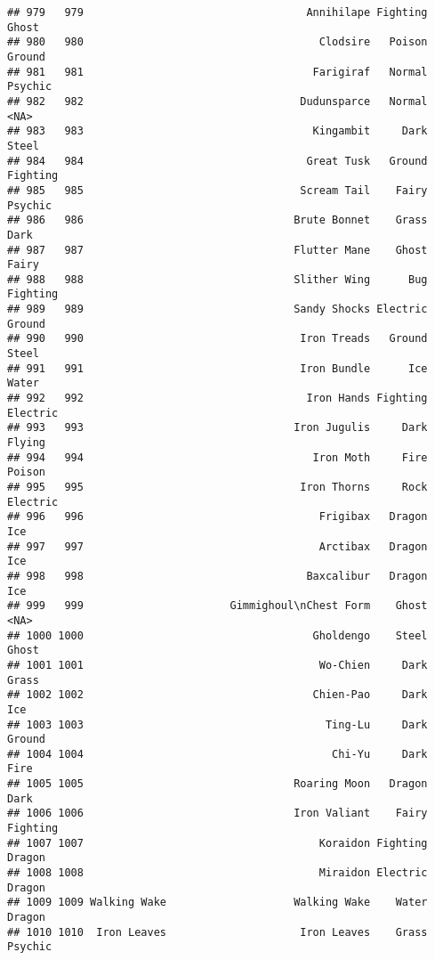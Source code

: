 \documentclass[
]{article}
\begin{document}
\begin{verbatim}
## 979   979                                   Annihilape Fighting    Ghost
## 980   980                                     Clodsire   Poison   Ground
## 981   981                                    Farigiraf   Normal  Psychic
## 982   982                                  Dudunsparce   Normal     <NA>
## 983   983                                    Kingambit     Dark    Steel
## 984   984                                   Great Tusk   Ground Fighting
## 985   985                                  Scream Tail    Fairy  Psychic
## 986   986                                 Brute Bonnet    Grass     Dark
## 987   987                                 Flutter Mane    Ghost    Fairy
## 988   988                                 Slither Wing      Bug Fighting
## 989   989                                 Sandy Shocks Electric   Ground
## 990   990                                  Iron Treads   Ground    Steel
## 991   991                                  Iron Bundle      Ice    Water
## 992   992                                   Iron Hands Fighting Electric
## 993   993                                 Iron Jugulis     Dark   Flying
## 994   994                                    Iron Moth     Fire   Poison
## 995   995                                  Iron Thorns     Rock Electric
## 996   996                                     Frigibax   Dragon      Ice
## 997   997                                     Arctibax   Dragon      Ice
## 998   998                                   Baxcalibur   Dragon      Ice
## 999   999                       Gimmighoul\nChest Form    Ghost     <NA>
## 1000 1000                                    Gholdengo    Steel    Ghost
## 1001 1001                                     Wo-Chien     Dark    Grass
## 1002 1002                                    Chien-Pao     Dark      Ice
## 1003 1003                                      Ting-Lu     Dark   Ground
## 1004 1004                                       Chi-Yu     Dark     Fire
## 1005 1005                                 Roaring Moon   Dragon     Dark
## 1006 1006                                 Iron Valiant    Fairy Fighting
## 1007 1007                                     Koraidon Fighting   Dragon
## 1008 1008                                     Miraidon Electric   Dragon
## 1009 1009 Walking Wake                    Walking Wake    Water   Dragon
## 1010 1010  Iron Leaves                     Iron Leaves    Grass  Psychic
\end{verbatim}
\end{document}
